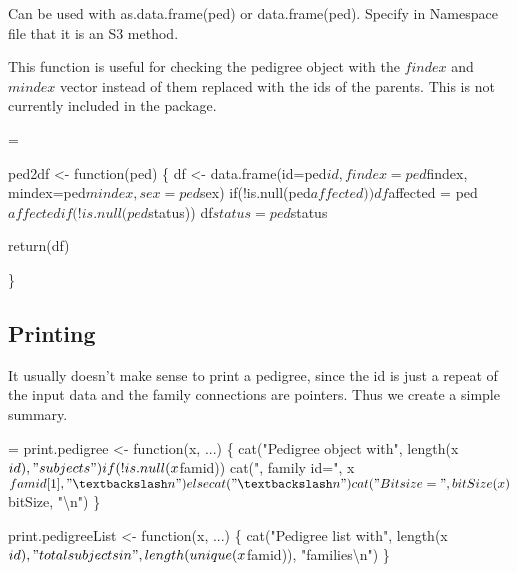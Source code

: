 \documentclass{article}
\begin{document}
Can be used with as.data.frame(ped) or data.frame(ped). Specify in Namespace
file that it is an S3 method.





This function is useful for checking the pedigree object with the
$findex$ and $mindex$ vector instead of them replaced with the ids of 
the parents.  This is not currently included in the package.

\begin{nwchunk}
=
 
 ped2df <- function(ped) \{
   df <- data.frame(id=ped$id, findex=ped$findex, mindex=ped$mindex, sex=ped$sex)
   if(!is.null(ped$affected))
     df$affected = ped$affected
 
   if(!is.null(ped$status))
     df$status = ped$status
 
   return(df)
 
 \}
 
\end{nwchunk}



\subsection{Printing}
It usually doesn't make sense to print a pedigree, since the id is just   %
a repeat of the input data and the family connections are pointers.
Thus we create a simple summary.

\begin{nwchunk}
=
 print.pedigree <- function(x, ...) \{
     cat("Pedigree object with", length(x$id), "subjects")
     if (!is.null(x$famid)) cat(", family id=", x$famid[1], "{\textbackslash}n")
     else cat("{\textbackslash}n")
     cat("Bit size=", bitSize(x)$bitSize, "{\textbackslash}n")
     \}
 
 print.pedigreeList <- function(x, ...) \{
     cat("Pedigree list with", length(x$id), "total subjects in",
         length(unique(x$famid)), "families{\textbackslash}n")
     \}
\end{nwchunk}
\end{document}
